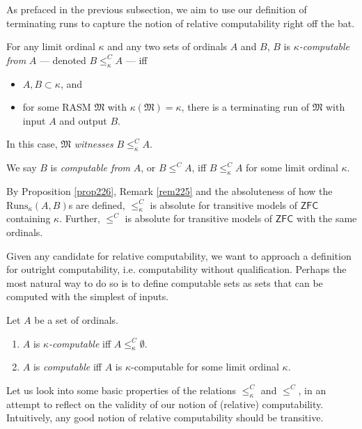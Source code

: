 \documentclass[12pt]{article}
\numberwithin{equation}{section}
\begin{document}
As prefaced in the previous subsection, we aim to use our definition of terminating runs to capture the notion of relative computability right off the bat.

\begin{defi}
For any limit ordinal $\kappa$ and any two sets of ordinals $A$ and $B$, $B$ is $\kappa$\emph{-computable from} $A$ --- denoted $B \leq^C_{\kappa} A$ --- iff
\begin{itemize}
    \item $A, B \subset \kappa$, and
    \item for some RASM $\mathfrak{M}$ with $\kappa(\mathfrak{M}) = \kappa$, there is a terminating run of $\mathfrak{M}$ with input $A$ and output $B$. 
\end{itemize}
In this case, $\mathfrak{M}$ \emph{witnesses} $B \leq^C_{\kappa} A$.
\end{defi}

\begin{defi}
We say $B$ is \emph{computable from} $A$, or $B \leq^C A$, iff $B \leq^C_{\kappa} A$ for some limit ordinal $\kappa$.
\end{defi}

By Proposition \ref{prop226}, Remark \ref{rem225} and the absoluteness of how the $\mathrm{Runs}_{\kappa}(A, B)$s are defined, $\leq^C_{\kappa}$ is absolute for transitive models of $\mathsf{ZFC}$ containing $\kappa$. Further, $\leq^C$ is absolute for transitive models of $\mathsf{ZFC}$ with the same ordinals. 

Given any candidate for relative computability, we want to approach a definition for outright computability, i.e. computability without qualification. Perhaps the most natural way to do so is to define computable sets as sets that can be computed with the simplest of inputs. 

\begin{defi}
Let $A$ be a set of ordinals.
\begin{enumerate}[label=(\arabic*)]
    \item $A$ is $\kappa$\emph{-computable} iff $A \leq^C_{\kappa} \emptyset$.
    \item $A$ is \emph{computable} iff $A$ is $\kappa$-computable for some limit ordinal $\kappa$.
\end{enumerate}
\end{defi}

Let us look into some basic properties of the relations $\leq^C_{\kappa}$ and $\leq^C$, in an attempt to reflect on the validity of our notion of (relative) computability. Intuitively, any good notion of relative computability should be transitive. 
\end{document}
